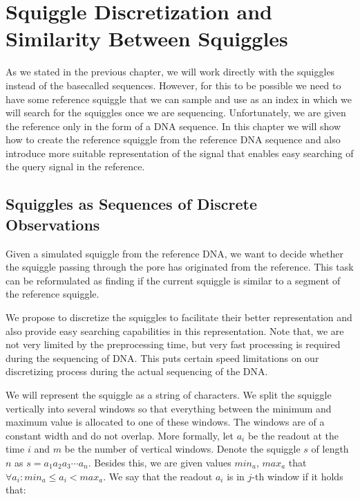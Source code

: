 \chapter{Squiggle Discretization and Similarity Between Squiggles}

\label{kap:proposedMethod}

As we stated in the previous chapter, we will work directly with the squiggles instead
of the basecalled sequences. However, for this to be possible we need to have 
some reference squiggle that we can sample and use as an index in which
we will search for the squiggles once we are sequencing.
Unfortunately, we are given the reference only in the form of a DNA sequence.
In this chapter we will show how to create the reference squiggle from the reference DNA sequence and also
introduce more suitable representation of the signal that enables easy searching of the
query signal in the reference.

\section{Squiggles as Sequences of Discrete Observations}
\label{section:squigglesAsDiscrete}

Given a simulated squiggle from the reference DNA, we want to decide whether the
squiggle passing through the pore has originated from the reference. This task
can be reformulated as finding if the current squiggle is similar to a segment of the reference squiggle.

We propose to discretize the squiggles to facilitate their better representation
and also provide easy searching capabilities in this representation. Note that, we are
not very limited by the preprocessing time, but very fast processing is required during
the sequencing of DNA. This puts certain speed limitations on our discretizing
process during the actual sequencing of the DNA.

We will represent the squiggle as a string of characters. We split the squiggle
vertically into several windows so that everything between the minimum and maximum
value is allocated to one of these windows. The windows are of a constant width and do not
overlap. More formally, let $a_i$ be the readout at the time $i$ and $m$ be the number of
vertical windows. Denote the squiggle $s$ of length $n$ as $s=a_1a_2a_3\cdots a_n$.
Besides this, we are given values $min_a$, $max_a$ that $\forall a_i: min_a \leq a_i < max_a$.
We say that the readout $a_i$ is in $j$-th window if it holds that:

